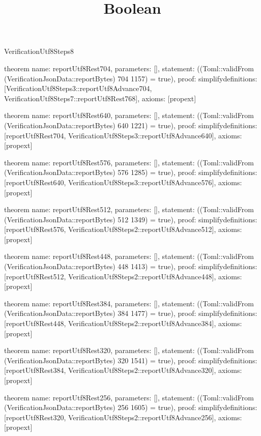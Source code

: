 \begin{lexlean}{VerificationUtf8Steps8}
\title{Boolean}
\begin{semanticmodule}

theorem{
  name: reportUtf8Rest704,
  parameters: [],
  statement: ((Toml::validFrom (VerificationJsonData::reportBytes) 704 1157) = true),
  proof: simplify{definitions: [VerificationUtf8Steps3::reportUtf8Advance704, VerificationUtf8Steps7::reportUtf8Rest768]},
  axioms: [propext]
}

theorem{
  name: reportUtf8Rest640,
  parameters: [],
  statement: ((Toml::validFrom (VerificationJsonData::reportBytes) 640 1221) = true),
  proof: simplify{definitions: [reportUtf8Rest704, VerificationUtf8Steps3::reportUtf8Advance640]},
  axioms: [propext]
}

theorem{
  name: reportUtf8Rest576,
  parameters: [],
  statement: ((Toml::validFrom (VerificationJsonData::reportBytes) 576 1285) = true),
  proof: simplify{definitions: [reportUtf8Rest640, VerificationUtf8Steps3::reportUtf8Advance576]},
  axioms: [propext]
}

theorem{
  name: reportUtf8Rest512,
  parameters: [],
  statement: ((Toml::validFrom (VerificationJsonData::reportBytes) 512 1349) = true),
  proof: simplify{definitions: [reportUtf8Rest576, VerificationUtf8Steps2::reportUtf8Advance512]},
  axioms: [propext]
}

theorem{
  name: reportUtf8Rest448,
  parameters: [],
  statement: ((Toml::validFrom (VerificationJsonData::reportBytes) 448 1413) = true),
  proof: simplify{definitions: [reportUtf8Rest512, VerificationUtf8Steps2::reportUtf8Advance448]},
  axioms: [propext]
}

theorem{
  name: reportUtf8Rest384,
  parameters: [],
  statement: ((Toml::validFrom (VerificationJsonData::reportBytes) 384 1477) = true),
  proof: simplify{definitions: [reportUtf8Rest448, VerificationUtf8Steps2::reportUtf8Advance384]},
  axioms: [propext]
}

theorem{
  name: reportUtf8Rest320,
  parameters: [],
  statement: ((Toml::validFrom (VerificationJsonData::reportBytes) 320 1541) = true),
  proof: simplify{definitions: [reportUtf8Rest384, VerificationUtf8Steps2::reportUtf8Advance320]},
  axioms: [propext]
}

theorem{
  name: reportUtf8Rest256,
  parameters: [],
  statement: ((Toml::validFrom (VerificationJsonData::reportBytes) 256 1605) = true),
  proof: simplify{definitions: [reportUtf8Rest320, VerificationUtf8Steps2::reportUtf8Advance256]},
  axioms: [propext]
}

\end{semanticmodule}
\end{lexlean}
